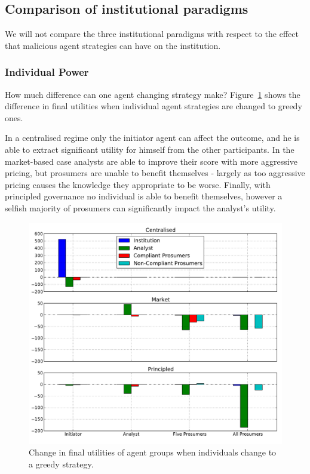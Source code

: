 \subsection{Comparison of institutional paradigms}

We will not compare the three institutional paradigms with respect to the effect that malicious agent strategies can have on the institution.

\subsubsection{Individual Power}

How much difference can one agent changing strategy make? Figure~\ref{fig:powerbar} shows the difference in final utilities when individual agent strategies are changed to greedy ones. 

In a centralised regime only the initiator agent can affect the outcome, and he is able to extract significant utility for himself from the other participants. In the market-based case analysts are able to improve their score with more aggressive pricing, but prosumers are unable to benefit themselves - largely as too aggressive pricing causes the knowledge they appropriate to be worse. Finally, with principled governance no individual is able to benefit themselves, however a selfish majority of prosumers can significantly impact the analyst's utility.

\begin{figure}
\includegraphics{gfx/kc/powerbar.pdf} 
\caption{Change in final utilities of agent groups when individuals change to a greedy strategy.}\label{fig:powerbar}
\end{figure}

